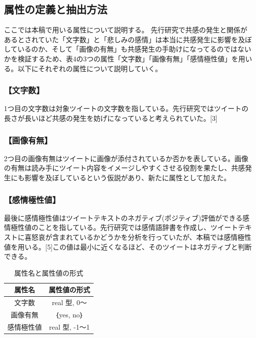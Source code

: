 \documentclass[dvipdfmx]{issj}
\begin{document}
\subsection{属性の定義と抽出方法}  %
ここでは本稿で用いる属性について説明する。
先行研究で共感の発生と関係があるとされていた「文字数」と「悲しみの感情」は本当に共感発生に影響を及ぼしているのか、そして「画像の有無」も共感発生の手助けになってるのではないかを検証するため、表4の3つの属性「文字数」「画像有無」「感情極性値」を用いる。以下にそれぞれの属性について説明していく。


\subsubsection{【文字数】}
1つ目の文字数は対象ツイートの文字数を指している。先行研究ではツイートの長さが長いほど共感の発生を妨げになっていると考えられていた。[3]

\subsubsection{【画像有無】}
2つ目の画像有無はツイートに画像が添付されているか否かを表している。画像の有無は読み手にツイート内容をイメージしやすくさせる役割を果たし、共感発生にも影響を及ぼしているという仮説があり、新たに属性として加えた。

\subsubsection{【感情極性値】}
最後に感情極性値はツイートテキストのネガティブ(ポジティブ)評価ができる感情極性値のことを指している。先行研究では感情語辞書を作成し、ツイートテキストに喜怒哀が含まれているかどうかを分析を行っていたが、本稿では感情極性値を用いる。[5]この値は最小に近くなるほど、そのツイートはネガティブと判断できる。

\begin{table}[t]\centering
\caption{属性名と属性値の形式}\label{tbl:font}
\begin{small}
\begin{tabular}{c|c} \hline\hline
属性名            & 属性値の形式\\\hline
文字数         & real 型, 0～\\
画像有無 & ｛yes, no｝\\
感情極性値     &  real 型, -1～1\\\hline
\end{tabular}
\end{small}
\end{table}
\end{document}
